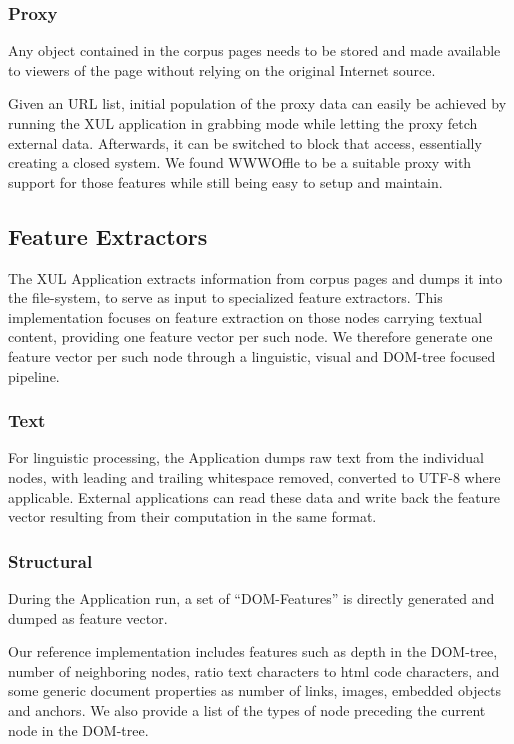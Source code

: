 \subsubsection{Proxy}

Any object contained in the corpus pages needs to be stored and made available to viewers of the page without relying on the original Internet source.

Given an URL list, initial population of the proxy data can easily be achieved by running the XUL application in grabbing mode while letting the proxy fetch external data.
Afterwards, it can be switched to block that access, essentially creating a closed system.
We found WWWOffle to be a suitable proxy with support for those features while still being easy to setup and maintain.

\subsection{Feature Extractors\label{extract}}

The XUL Application extracts information from corpus pages and dumps it into the file-system, to serve as input to specialized feature extractors.
This implementation focuses on feature extraction on those nodes carrying textual content, providing one feature vector per such node.
We therefore generate one feature vector per such node through a linguistic, visual and DOM-tree focused pipeline.

\subsubsection{Text}

For linguistic processing, the Application dumps raw text from the individual nodes, with leading and trailing whitespace removed, converted to UTF-8 where applicable.
External applications can read these data and write back the feature vector resulting from their computation in the same format.

\subsubsection{Structural}

During the Application run, a set of ``DOM-Features'' is directly generated and dumped as feature vector.

Our reference implementation includes features such as depth in the DOM-tree, number of neighboring nodes, ratio text characters to html code characters,
  and some generic document properties as number of links, images, embedded objects and anchors.
We also provide a list of the types of node preceding the current node in the DOM-tree.

